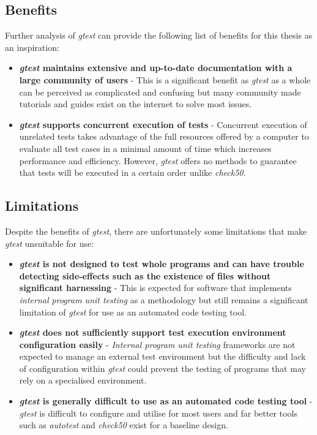 \documentclass[hidelinks, 12pt]{extreport}
\begin{document}
\subsection{Benefits}

Further analysis of \textit{gtest} can provide the following list of benefits for this thesis as an inspiration:
\begin{itemize}
	\item \textbf{\textit{gtest} maintains extensive and up-to-date documentation with a large community of users} - This is a significant benefit as \textit{gtest} as a whole can be perceived as complicated and confusing but many community made tutorials and guides exist on the internet to solve most issues.
	\item \textbf{\textit{gtest} supports concurrent execution of tests} - Concurrent execution of unrelated tests takes advantage of the full resources offered by a computer to evaluate all test cases in a minimal amount of time which increases performance and efficiency. However, \textit{gtest} offers no methods to guarantee that tests will be executed in a certain order unlike \textit{check50}. 
\end{itemize} 

\subsection{Limitations}

Despite the benefits of \textit{gtest}, there are unfortunately some limitations that make \textit{gtest} unsuitable for use:
\begin{itemize}
	\item \textbf{\textit{gtest} is not designed to test whole programs and can have trouble detecting side-effects such as the existence of files without significant harnessing} - This is expected for software that implements \textit{internal program unit testing} as a methodology but still remains a significant limitation of \textit{gtest} for use as an automated code testing tool.
	\item \textbf{\textit{gtest} does not sufficiently support test execution environment configuration easily} - \textit{Internal program unit testing} frameworks are not expected to manage an external test environment but the difficulty and lack of configuration within \textit{gtest} could prevent the testing of programs that may rely on a specialised environment.
	\item \textbf{\textit{gtest} is generally difficult to use as an automated code testing tool} - \textit{gtest} is difficult to configure and utilise for most users and far better tools such as \textit{autotest} and \textit{check50} exist for a baseline design.
\end{itemize}
\end{document}
